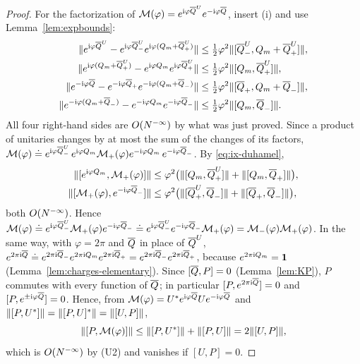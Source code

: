 \begin{proof}
For the factorization of $\mathcal M(\varphi)=e^{\mathrm{i}\varphi\overline{Q}^U}e^{-\mathrm{i}\varphi\overline{Q}}$, insert (i) and use Lemma~\ref{lem:expbounds}:
\begin{align*}
\lVert e^{\mathrm{i}\varphi\overline{Q}^U}-e^{\mathrm{i}\varphi\overline{Q}^U_-}e^{\mathrm{i}\varphi(Q_m+\overline{Q}^U_+)}\rVert&\le\tfrac12\varphi^2\lVert[\overline{Q}^U_-,Q_m+\overline{Q}^U_+]\rVert,\\
\lVert e^{\mathrm{i}\varphi(Q_m+\overline{Q}^U_+)}-e^{\mathrm{i}\varphi Q_m}e^{\mathrm{i}\varphi\overline{Q}^U_+}\rVert&\le\tfrac12\varphi^2\lVert[Q_m,\overline{Q}^U_+]\rVert,\\
\lVert e^{-\mathrm{i}\varphi\overline{Q}}-e^{-\mathrm{i}\varphi\overline{Q}_+}e^{-\mathrm{i}\varphi(Q_m+\overline{Q}_-)}\rVert&\le\tfrac12\varphi^2\lVert[\overline{Q}_+,Q_m+\overline{Q}_-]\rVert,\\
\lVert e^{-\mathrm{i}\varphi(Q_m+\overline{Q}_-)}-e^{-\mathrm{i}\varphi Q_m}e^{-\mathrm{i}\varphi\overline{Q}_-}\rVert&\le\tfrac12\varphi^2\lVert[Q_m,\overline{Q}_-]\rVert .
\end{align*}
All four right-hand sides are $O(N^{-\infty})$ by what was just proved. Since a product of unitaries changes by at most the
sum of the changes of its factors,
$\mathcal M(\varphi)\doteq e^{\mathrm{i}\varphi\overline{Q}^U_-}\,e^{\mathrm{i}\varphi Q_m}\mathcal M_+(\varphi)e^{-\mathrm{i}\varphi Q_m}\,e^{-\mathrm{i}\varphi\overline{Q}_-}$. By
\eqref{eq:ix-duhamel},
\begin{align*}
\lVert[e^{\mathrm{i}\varphi Q_m},\mathcal M_+(\varphi)]\rVert&\le\varphi^2\bigl(\lVert[Q_m,\overline{Q}^U_+]\rVert+\lVert[Q_m,\overline{Q}_+]\rVert\bigr),\\
\lVert[\mathcal M_+(\varphi),e^{-\mathrm{i}\varphi\overline{Q}_-}]\rVert&\le\varphi^2\bigl(\lVert[\overline{Q}^U_+,\overline{Q}_-]\rVert+\lVert[\overline{Q}_+,\overline{Q}_-]\rVert\bigr),
\end{align*}
both $O(N^{-\infty})$. Hence $\mathcal M(\varphi)\doteq e^{\mathrm{i}\varphi\overline{Q}^U_-}\mathcal M_+(\varphi)e^{-\mathrm{i}\varphi\overline{Q}_-}\doteq e^{\mathrm{i}\varphi\overline{Q}^U_-}e^{-\mathrm{i}\varphi\overline{Q}_-}\mathcal M_+(\varphi)
=\mathcal M_-(\varphi)\mathcal M_+(\varphi)$. In the same way, with $\varphi=2\pi$ and $\overline{Q}$ in place of $\overline{Q}^U$,
$e^{2\pi\mathrm{i}\overline{Q}}\doteq e^{2\pi\mathrm{i}\overline{Q}_-}e^{2\pi\mathrm{i} Q_m}e^{2\pi\mathrm{i}\overline{Q}_+}=e^{2\pi\mathrm{i}\overline{Q}_-}e^{2\pi\mathrm{i}\overline{Q}_+}$, because $e^{2\pi\mathrm{i} Q_m}=\mathbf{1}$
(Lemma~\ref{lem:charges-elementary}). Since $[\overline{Q},P]=0$ (Lemma~\ref{lem:KP}), $P$ commutes with every function of $\overline{Q}$; in
particular $[P,e^{2\pi\mathrm{i}\overline{Q}}]=0$ and $[P,e^{\pm\mathrm{i}\varphi\overline{Q}}]=0$. Hence, from $\mathcal M(\varphi)=U^*e^{\mathrm{i}\varphi\overline{Q}}Ue^{-\mathrm{i}\varphi\overline{Q}}$
and $\lVert[P,U^*]\rVert=\lVert[P,U]^*\rVert=\lVert[U,P]\rVert$,
\[
\lVert[P,\mathcal M(\varphi)]\rVert\le\lVert[P,U^*]\rVert+\lVert[P,U]\rVert=2\lVert[U,P]\rVert,
\]
which is $O(N^{-\infty})$ by (U2) and vanishes if $[U,P]=0$.
\end{proof}

